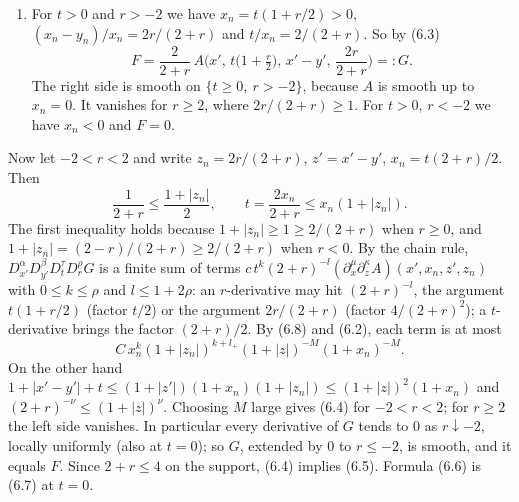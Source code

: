\documentclass[
  11pt,
]{article}
\providecommand{\tightlist}{%
  \setlength{\itemsep}{0pt}\setlength{\parskip}{0pt}}
\begin{document}
\begin{enumerate}
\def\labelenumi{(\alph{enumi})}
\setcounter{enumi}{2}
\tightlist
\item
  For \(t>0\) and \(r>-2\) we have \(x_n=t(1+r/2)>0\),
  \((x_n-y_n)/x_n=2r/(2+r)\) and \(t/x_n=2/(2+r)\). So by (6.3) \[
F=\frac2{2+r}\,A\Big(x',\,t\big(1+\tfrac r2\big),\,x'-y',\,\frac{2r}{2+r}\Big)=:G .
\tag{6.7}
\] The right side is smooth on \(\{t\geq0,\ r>-2\}\), because \(A\) is
  smooth up to \(x_n=0\). It vanishes for \(r\geq2\), where
  \(2r/(2+r)\geq1\). For \(t>0\), \(r<-2\) we have \(x_n<0\) and
  \(F=0\).
\end{enumerate}

Now let \(-2<r<2\) and write \(z_n=2r/(2+r)\), \(z'=x'-y'\),
\(x_n=t(2+r)/2\). Then \[
\frac1{2+r}\leq\frac{1+|z_n|}2,\qquad t=\frac{2x_n}{2+r}\leq x_n(1+|z_n|).
\tag{6.8}
\] The first inequality holds because \(1+|z_n|\geq1\geq2/(2+r)\) when
\(r\geq0\), and \(1+|z_n|=(2-r)/(2+r)\geq2/(2+r)\) when \(r<0\). By the
chain rule, \(D^\alpha_{x'}D^\beta_{y'}D^\tau_tD^\rho_rG\) is a finite
sum of terms
\(c\,t^k(2+r)^{-l}(\partial_x^\mu\partial_z^\kappa A)(x',x_n,z',z_n)\)
with \(0\leq k\leq\rho\) and \(l\leq1+2\rho\): an \(r\)-derivative may
hit \((2+r)^{-l}\), the argument \(t(1+r/2)\) (factor \(t/2\)) or the
argument \(2r/(2+r)\) (factor \(4/(2+r)^2\)); a \(t\)-derivative brings
the factor \((2+r)/2\). By (6.8) and (6.2), each term is at most \[
C\,x_n^k(1+|z_n|)^{k+l_+}(1+|z|)^{-M}(1+x_n)^{-M}.
\] On the other hand
\(1+|x'-y'|+t\leq(1+|z'|)(1+x_n)(1+|z_n|)\leq(1+|z|)^2(1+x_n)\) and
\((2+r)^{-\nu}\leq(1+|z|)^\nu\). Choosing \(M\) large gives (6.4) for
\(-2<r<2\); for \(r\geq2\) the left side vanishes. In particular every
derivative of \(G\) tends to 0 as \(r\downarrow-2\), locally uniformly
(also at \(t=0\)); so \(G\), extended by 0 to \(r\leq-2\), is smooth,
and it equals \(F\). Since \(2+r\leq4\) on the support, (6.4) implies
(6.5). Formula (6.6) is (6.7) at \(t=0\).
\end{document}
